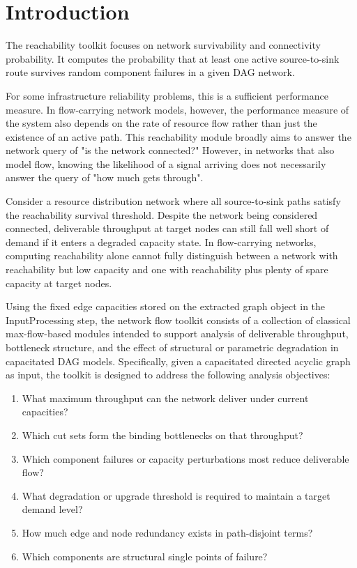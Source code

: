 \documentclass[12pt]{report}
\begin{document}
\section{Introduction}
The reachability toolkit focuses on network survivability and connectivity probability. It computes the probability that at least one active source-to-sink route survives random component failures in a given DAG network.

For some infrastructure reliability problems, this is a sufficient performance measure. In flow-carrying network models, however, the performance measure of the system also depends on the rate of resource flow rather than just the existence of an active path. This reachability module broadly aims to answer the network query of "is the network connected?" However, in networks that also model flow, knowing the likelihood of a signal arriving does not necessarily answer the query of "how much gets through".

Consider a resource distribution network where all source-to-sink paths satisfy the reachability survival threshold. Despite the network being considered connected, deliverable throughput at target nodes can still fall well short of demand if it enters a degraded capacity state. In flow-carrying networks, computing reachability alone cannot fully distinguish between a network with reachability but low capacity and one with reachability plus plenty of spare capacity at target nodes. 

Using the fixed edge capacities stored on the extracted graph object in the InputProcessing step, the network flow toolkit consists of a collection of classical max-flow-based modules intended to support analysis of deliverable throughput, bottleneck structure, and the effect of structural or parametric degradation in capacitated DAG models.
Specifically, given a capacitated directed acyclic graph as input, the toolkit is designed to address the following analysis objectives:
\begin{enumerate}[label=\textbf{Q\arabic*.}]
    \item What maximum throughput can the network deliver under current capacities?
    \item Which cut sets form the binding bottlenecks on that throughput?
    \item Which component failures or capacity perturbations most reduce deliverable flow?
    \item What degradation or upgrade threshold is required to maintain a target demand level?
    \item How much edge and node redundancy exists in path-disjoint terms?
    \item Which components are structural single points of failure?
\end{enumerate}
\end{document}
